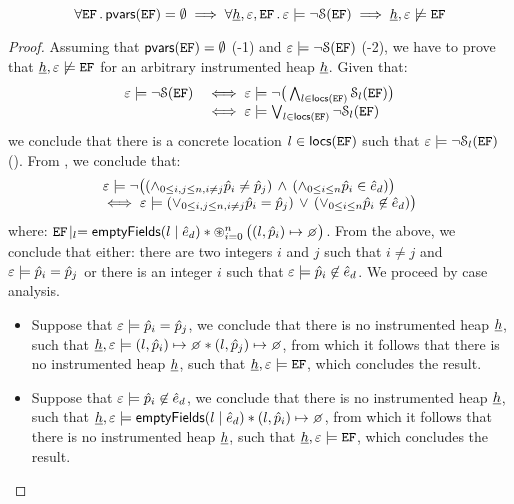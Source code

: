 \begin{lemma}
$$
  \forall \efs \, . \, \pvars(\efs) = \emptyset \implies  
  	\forall \iheap, \senv, \efs \, . \, 
		\senv \satisfies \neg \sanity{\efs} \implies \iheap, \senv \not\satisfies \efs
$$
\end{lemma}
\begin{proof}
Assuming that $\pvars(\efs) = \emptyset$ (\hyp{1}) and $\senv \satisfies \neg \sanity{\efs}$ (\hyp{2}), 
we have to prove that $\iheap, \senv \not\satisfies \efs$ for an arbitrary instrumented heap $\iheap$. 
Given that: 
$$
\begin{array}{ll}
\senv  \satisfies \neg \sanity{\efs} 
	& \iff \senv \satisfies \neg \big(\bigwedge_{\loc \in \eflocs(\efs)}\sanityl{\efs}{\loc} \big) \\
	& \iff \senv \satisfies  \bigvee_{\loc \in \eflocs(\efs)} \neg \sanityl{\efs}{\loc} 
	
\end{array}
$$
we conclude that there is a concrete location $\loc \in \eflocs(\efs)$ such that 
$\senv \satisfies  \neg \sanityl{\efs}{\loc}$ ().
From , we conclude that: 
$$
\begin{array}{l}
 \senv \satisfies \neg\big((\wedge_{0 \leq i, j \leq n, i \neq j} \sexprp_i \neq \sexprp_j)  \, \wedge \,  (\wedge_{0 \leq i \leq n} \sexprp_i \in \sexpr_d)\big) \\
    \iff \senv \satisfies (\vee_{0 \leq i, j \leq n, i \neq j} \sexprp_i = \sexprp_j) \, \vee \, (\vee_{0 \leq i \leq n} \sexprp_i \not\in \sexpr_d)\big)
\end{array}
$$
where: $\efproj{\efs}{\loc} = \emptyfields{\loc}{\sexpr_d} \sep  \oast_{i = 0}^{n} \, \big((l, \sexprp_i) \mapsto \none \big)$. 
From the above, we conclude that either:  there are two integers $i$ and $j$ such that $i \neq j$ and $\senv \satisfies \sexprp_i = \sexprp_j$ 
or  there is an integer $i$ such that $\senv \satisfies \sexprp_i \not\in \sexpr_d$. We proceed by case analysis. 
\begin{itemize}
   \item Suppose that $\senv \satisfies \sexprp_i = \sexprp_j$, we conclude that there is no 
            instrumented heap $\iheap$, such that $\iheap, \senv \satisfies (l, \sexprp_i) \mapsto \none \sep (l, \sexprp_j) \mapsto \none$, 
            from which it follows that there is no instrumented heap $\iheap$, such that $\iheap, \senv \satisfies \efs$, 
            which concludes the result. 
%
  \item Suppose that $\senv \satisfies \sexprp_i \not\in \sexpr_d$, we conclude that there is no 
            instrumented heap $\iheap$, such that $\iheap, \senv \satisfies \emptyfields{\loc}{\sexpr_d} \sep (l, \sexprp_i) \mapsto \none$, 
            from which it follows that there is no instrumented heap $\iheap$, such that $\iheap, \senv \satisfies \efs$, 
            which concludes the result.
\end{itemize}
\end{proof}





